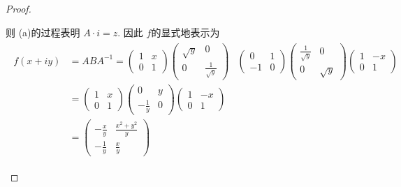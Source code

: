 \documentclass[../main.tex]{subfiles}
\begin{document}
\begin{proof}
\begin{enumerate}
\[    \] 则 (a)的过程表明 \(  A\cdot i= z  \). 因此 \(  f  \)的显式地表示为 \[
    \begin{aligned}
  \begin{aligned}
    f\left( x+ iy \right)&= ABA^{-1} =  \begin{pmatrix} 
        1&x\\ 
         0&1 
    \end{pmatrix}\begin{pmatrix} 
        \sqrt{y}&0\\ 
         0&\frac{1 }{\sqrt{y} }  
    \end{pmatrix}&\begin{pmatrix} 
        0&1\\ 
         -1&0 
    \end{pmatrix}\begin{pmatrix} 
        \frac{1 }{\sqrt{y} }&0\\ 
         0&\sqrt{y}  
    \end{pmatrix}    \begin{pmatrix} 
        1&-x\\ 
         0&1 
    \end{pmatrix} \\ 
     &= \begin{pmatrix} 
         1&x\\ 
          0&1 
     \end{pmatrix}\begin{pmatrix} 
           0&y\\ 
            -\frac{1 }{y }&0 
     \end{pmatrix}\begin{pmatrix} 
         1&-x\\ 
          0&1 
     \end{pmatrix}\\ 
      &= \begin{pmatrix} 
          -\frac{x }{y }& \frac{x^{2}+ y^{2} }{y }\\ 
           -\frac{1 }{y }&\frac{x }{y }     
      \end{pmatrix}      
  \end{aligned}  
    \end{aligned}
    \]   
   \end{enumerate}
   
\end{proof}
\end{document}
